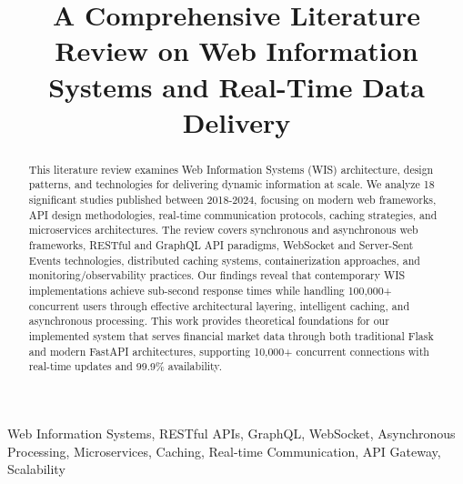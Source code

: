 \documentclass[conference]{IEEEtran}
\begin{document}
\title{A Comprehensive Literature Review on Web Information Systems and Real-Time Data Delivery\\
{\footnotesize \textsuperscript{}}
}

\author{
\and
{}
}

\maketitle

\begin{abstract}
This literature review examines Web Information Systems (WIS) architecture, design patterns, and technologies for delivering dynamic information at scale. We analyze 18 significant studies published between 2018-2024, focusing on modern web frameworks, API design methodologies, real-time communication protocols, caching strategies, and microservices architectures. The review covers synchronous and asynchronous web frameworks, RESTful and GraphQL API paradigms, WebSocket and Server-Sent Events technologies, distributed caching systems, containerization approaches, and monitoring/observability practices. Our findings reveal that contemporary WIS implementations achieve sub-second response times while handling 100,000+ concurrent users through effective architectural layering, intelligent caching, and asynchronous processing. This work provides theoretical foundations for our implemented system that serves financial market data through both traditional Flask and modern FastAPI architectures, supporting 10,000+ concurrent connections with real-time updates and 99.9\% availability.
\end{abstract}

\begin{IEEEkeywords}
Web Information Systems, RESTful APIs, GraphQL, WebSocket, Asynchronous Processing, Microservices, Caching, Real-time Communication, API Gateway, Scalability
\end{IEEEkeywords}
\end{document}

